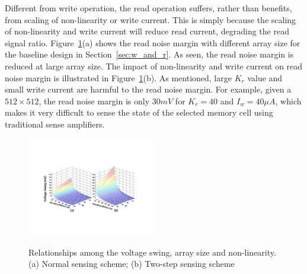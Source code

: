Different from write operation, the read operation suffers, rather than benefits, from scaling of non-linearity or write current. This is simply because the scaling of non-linearity and write current will reduce read current, degrading the read signal ratio. Figure~\ref{fig:sense_margin}(a) shows the read noise margin with different array size for the baseline design in Section~\ref{sec:w_and_r}.  As seen, the read noise margin is reduced at large array size. The impact of non-linearity and write current on read noise margin is illustrated in Figure~\ref{fig:sense_margin}(b). As mentioned, large $K_r$ value and small write current are harmful to the read noise margin. For example, given a $512 \times 512$, the read noise margin is only $30mV$ for $K_r=40$ and $I_w=40\mu A$, which makes it very difficult to sense the state of the selected memory cell using traditional sense amplifiers.

\begin{figure}[!t]
\centering
  \includegraphics[width=0.5\textwidth]{./figures/sense_margin_f}\\
  \caption{Relationships among the voltage swing, array size and non-linearity. (a) Normal sensing scheme; (b) Two-step sensing scheme}\label{fig:sense_margin}
\end{figure}



